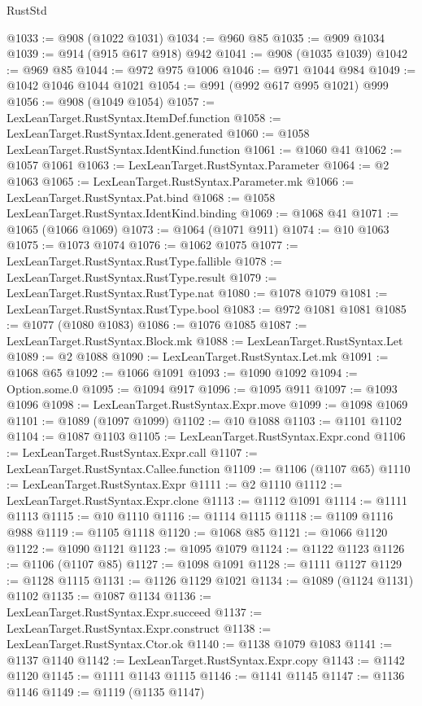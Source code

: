 \begin{lexlean}{RustStd}
\begin{coremodule}
@1033 := @908 (@1022 @1031)
@1034 := @960 @85
@1035 := @909 @1034
@1039 := @914 (@915 @617 @918) @942
@1041 := @908 (@1035 @1039)
@1042 := @969 @85
@1044 := @972 @975 @1006
@1046 := @971 @1044 @984
@1049 := @1042 @1046 @1044 @1021
@1054 := @991 (@992 @617 @995 @1021) @999
@1056 := @908 (@1049 @1054)
@1057 := LexLeanTarget.RustSyntax.ItemDef.function
@1058 := LexLeanTarget.RustSyntax.Ident.generated
@1060 := @1058 LexLeanTarget.RustSyntax.IdentKind.function
@1061 := @1060 @41
@1062 := @1057 @1061
@1063 := LexLeanTarget.RustSyntax.Parameter
@1064 := @2 @1063
@1065 := LexLeanTarget.RustSyntax.Parameter.mk
@1066 := LexLeanTarget.RustSyntax.Pat.bind
@1068 := @1058 LexLeanTarget.RustSyntax.IdentKind.binding
@1069 := @1068 @41
@1071 := @1065 (@1066 @1069)
@1073 := @1064 (@1071 @911)
@1074 := @10 @1063
@1075 := @1073 @1074
@1076 := @1062 @1075
@1077 := LexLeanTarget.RustSyntax.RustType.fallible
@1078 := LexLeanTarget.RustSyntax.RustType.result
@1079 := LexLeanTarget.RustSyntax.RustType.nat
@1080 := @1078 @1079
@1081 := LexLeanTarget.RustSyntax.RustType.bool
@1083 := @972 @1081 @1081
@1085 := @1077 (@1080 @1083)
@1086 := @1076 @1085
@1087 := LexLeanTarget.RustSyntax.Block.mk
@1088 := LexLeanTarget.RustSyntax.Let
@1089 := @2 @1088
@1090 := LexLeanTarget.RustSyntax.Let.mk
@1091 := @1068 @65
@1092 := @1066 @1091
@1093 := @1090 @1092
@1094 := Option.some.{0}
@1095 := @1094 @917
@1096 := @1095 @911
@1097 := @1093 @1096
@1098 := LexLeanTarget.RustSyntax.Expr.move
@1099 := @1098 @1069
@1101 := @1089 (@1097 @1099)
@1102 := @10 @1088
@1103 := @1101 @1102
@1104 := @1087 @1103
@1105 := LexLeanTarget.RustSyntax.Expr.cond
@1106 := LexLeanTarget.RustSyntax.Expr.call
@1107 := LexLeanTarget.RustSyntax.Callee.function
@1109 := @1106 (@1107 @65)
@1110 := LexLeanTarget.RustSyntax.Expr
@1111 := @2 @1110
@1112 := LexLeanTarget.RustSyntax.Expr.clone
@1113 := @1112 @1091
@1114 := @1111 @1113
@1115 := @10 @1110
@1116 := @1114 @1115
@1118 := @1109 @1116 @988
@1119 := @1105 @1118
@1120 := @1068 @85
@1121 := @1066 @1120
@1122 := @1090 @1121
@1123 := @1095 @1079
@1124 := @1122 @1123
@1126 := @1106 (@1107 @85)
@1127 := @1098 @1091
@1128 := @1111 @1127
@1129 := @1128 @1115
@1131 := @1126 @1129 @1021
@1134 := @1089 (@1124 @1131) @1102
@1135 := @1087 @1134
@1136 := LexLeanTarget.RustSyntax.Expr.succeed
@1137 := LexLeanTarget.RustSyntax.Expr.construct
@1138 := LexLeanTarget.RustSyntax.Ctor.ok
@1140 := @1138 @1079 @1083
@1141 := @1137 @1140
@1142 := LexLeanTarget.RustSyntax.Expr.copy
@1143 := @1142 @1120
@1145 := @1111 @1143 @1115
@1146 := @1141 @1145
@1147 := @1136 @1146
@1149 := @1119 (@1135 @1147)

\end{coremodule}
\end{lexlean}

